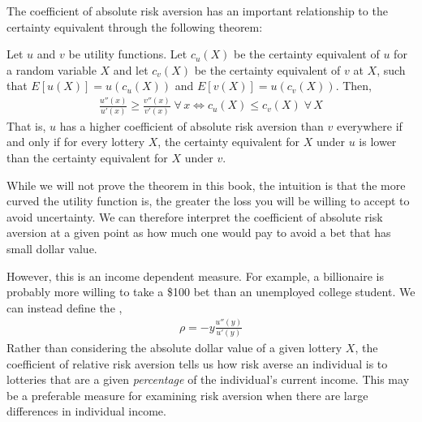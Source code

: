 The coefficient of absolute risk aversion has an important relationship to the certainty equivalent through the following theorem:

\begin{theorem*}
    Let $u$ and $v$ be utility functions. Let $c_u(X)$ be the certainty equivalent of $u$ for a random variable $X$ and let $c_v(X)$ be the certainty equivalent of $v$ at $X$, such that $E[u(X)] = u(c_u(X))$ and $E[v(X)] = u(c_v(X))$. Then,
    \begin{align*}
        \frac{u''(x)}{u'(x)} \geq \frac{v''(x)}{v'(x)} \; \forall \, x \iff c_u(X) \leq c_v(X) \; \forall \, X
    \end{align*}
    That is, $u$ has a higher coefficient of absolute risk aversion than $v$ everywhere if and only if for every lottery $X$, the certainty equivalent for $X$ under $u$ is lower than the certainty equivalent for $X$ under $v$. 
\end{theorem*}

While we will not prove the theorem in this book, the intuition is that the more curved the utility function is, the greater the loss you will be willing to accept to avoid uncertainty. We can therefore interpret the coefficient of absolute risk aversion at a given point as how much one would pay to avoid a bet that has small dollar value.

However, this is an income dependent measure. For example, a billionaire is probably more willing to take a \$100 bet than an unemployed college student. We can instead define the , 
\begin{align*}
    \rho = -y \frac{u''(y)}{u'(y)}
\end{align*}
Rather than considering the absolute dollar value of a given lottery $X$, the coefficient of relative risk aversion tells us how risk averse an individual is to lotteries that are a given \emph{percentage} of the individual's current income. This may be a preferable measure for examining risk aversion when there are large differences in individual income. 

